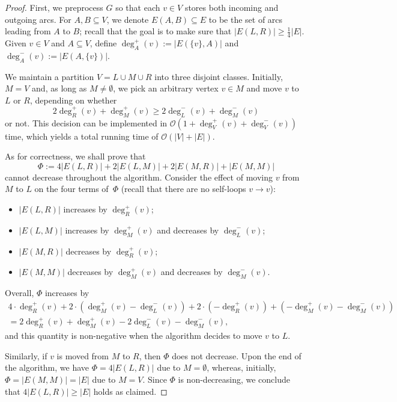 \documentclass[a4paper]{article}
\theoremstyle{definition}
\theoremstyle{remark}
\newcommand{\sub}{\subseteq}
\newcommand{\Oh}{\mathcal{O}}
\begin{document}
\AMDC*
\begin{proof}
First, we preprocess $G$ so that each $v\in V$ stores both incoming and outgoing arcs.
For $A,B\sub V$, we denote $E(A,B)\sub E$ to be the set of arcs leading from $A$ to $B$;
recall that the goal is to make sure that $|E(L,R)|\ge \tfrac14|E|$.
Given $v\in V$ and $A\sub V$, define $\deg^+_A(v):=|E(\{v\},A)|$
and $\deg^-_A(v):= |E(A,\{v\})|$.

We maintain a partition $V = L \cup M \cup R$ into three disjoint classes.
Initially, $M=V$ and, as long as $M\ne \emptyset$, we pick an arbitrary vertex $v\in M$
and move $v$ to $L$ or $R$, depending on whether \[2\deg^+_R(v)+\deg^+_M(v)\ge 2\deg^-_L(v)+\deg^-_M(v)\]
or not.
This decision can be implemented in $\Oh(1+\deg^+_V(v)+\deg^-_V(v))$ time, which yields a total running time of $\Oh(|V|+|E|)$.

As for correctness, we shall prove that \[\Phi:=4|E(L,R)| + 2|E(L,M)| +2|E(M,R)|+|E(M,M)|\]
cannot decrease throughout the algorithm.
Consider the effect of moving $v$ from $M$ to $L$ on the four terms of~$\Phi$ (recall that there are no self-loops $v\to v$):
\begin{itemize}
  \item $|E(L,R)|$ increases by $\deg^+_R(v)$;
  \item $|E(L,M)|$ increases by $\deg^+_M(v)$ and decreases by $\deg^-_L(v)$;
  \item $|E(M,R)|$ decreases by $\deg^+_R(v)$;
  \item $|E(M,M)|$ decreases by $\deg^+_M(v)$ and decreases by $\deg^-_M(v)$.
\end{itemize}
Overall, $\Phi$ increases by 
  \begin{align*}4\cdot \deg^+_R(v) + 2\cdot (\deg^+_M(v) - \deg^-_L(v)) + 2\cdot (-\deg^+_R(v)) + (- \deg^+_M(v) - \deg^-_M(v))\\  = 2\deg^+_R(v) + \deg^+_M(v) - 2\deg^-_L(v) - \deg^-_M(v),\end{align*}
and this quantity is non-negative when the algorithm decides to move $v$ to $L$. 

Similarly, if $v$ is moved from $M$ to $R$, then $\Phi$ does not decrease.
Upon the end of the algorithm, we have $\Phi=4|E(L,R)|$ due to $M=\emptyset$,
whereas, initially, $\Phi = |E(M,M)|=|E|$ due to $M=V$. 
Since $\Phi$ is non-decreasing, we conclude that $4|E(L,R)|\ge |E|$ holds as claimed. 
\end{proof}
\end{document}

